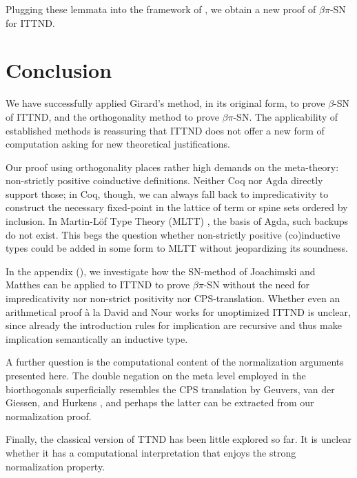 \documentclass[a4paper,USenglish,cleveref, autoref, thm-restate]{lipics-v2021}
\begin{document}
Plugging these lemmata into the framework of , we
obtain a new proof of $\beta\pi$-SN for ITTND.

\section{Conclusion}
\label{sec:concl}

We have successfully applied Girard's method, in its original form, to
prove $\beta$-SN of ITTND, and the orthogonality method to prove
$\beta\pi$-SN.  The applicability of established methods is reassuring
that ITTND does not offer a new form of computation asking for new
theoretical justifications.

Our proof using orthogonality places rather high demands on the
meta-theory: non-strictly positive coinductive definitions.  Neither
Coq nor Agda directly support those; in Coq, though, we can always
fall back to impredicativity to construct the necessary fixed-point in
the lattice of term or spine sets ordered by inclusion.  In
Martin-L\"of Type Theory (MLTT) \cite{MartinLoef84}, the basis of
Agda, such backups do not exist.  This begs the question whether
non-strictly positive (co)inductive types could be added in some form
to MLTT without jeopardizing its soundness.

In the appendix (), we investigate how
the SN-method of
Joachimski and Matthes \cite{matthes:shortproofs,matthes:classlog}
can be applied to
ITTND to prove $\beta\pi$-SN without the need for impredicativity nor
non-strict positivity nor CPS-translation.  Whether even an
arithmetical proof \`a la David and Nour
\cite{david:normWithoutRed,davidNour:tlca05} works for unoptimized
ITTND is unclear, since already the introduction rules for implication
are recursive and thus make implication semantically an inductive type.

A further question is the computational content of the normalization
arguments presented here.  The double negation on the meta level
employed in the biorthogonals superficially resembles the CPS
translation by Geuvers, van der Giessen, and Hurkens
\cite{geuversGiessenHurkens:fundinf19}, and perhaps the latter can be
extracted from our normalization proof.

Finally, the classical version of TTND has been little explored so
far.  It is unclear whether it has a computational interpretation that
enjoys the strong normalization property.







\clearpage

\appendix


\end{document}
